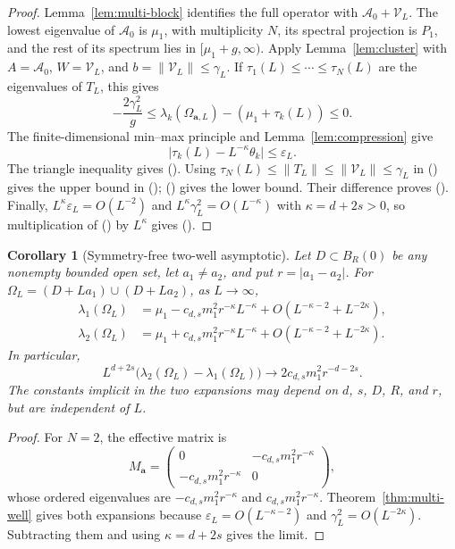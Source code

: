 \documentclass[twoside,10pt]{article}
\numberwithin{equation}{section}
\theoremstyle{slbody}
\newtheorem{corollary}[theorem]{Corollary}
\theoremstyle{definition}
\newcommand{\norm}[1]{\lVert #1\rVert}
\newcommand{\abs}[1]{\lvert #1\rvert}
\renewcommand{\eqref}[1]{%
  \textup{{\normalfont(\oldstylenums{\ref{#1}}}\normalfont)}}
\begin{document}
\begin{proof}
Lemma~\ref{lem:multi-block} identifies the full operator with
$\mathcal A_0+\mathcal V_L$.  The lowest eigenvalue of $\mathcal A_0$ is
$\mu_1$, with multiplicity $N$, its spectral projection is $P_1$, and the
rest of its spectrum lies in $[\mu_1+g,\infty)$.  Apply
Lemma~\ref{lem:cluster} with $A=\mathcal A_0$, $W=\mathcal V_L$, and
$b=\norm{\mathcal V_L}\leq\gamma_L$.  If
$\tau_1(L)\leq\cdots\leq\tau_N(L)$ are the eigenvalues of $T_L$, this gives
\begin{equation}\label{eq:exact-cluster-comparison}
 -\frac{2\gamma_L^2}{g}
 \leq\lambda_k(\Omega_{\mathbf a,L})-(\mu_1+\tau_k(L))\leq0.
\end{equation}
The finite-dimensional min--max principle and
Lemma~\ref{lem:compression} give
\[
 \abs{\tau_k(L)-L^{-\kappa}\theta_k}\leq\varepsilon_L.
\]
The triangle inequality gives \eqref{eq:multi-eigenvalue-bound}.  Using
$\tau_N(L)\leq\norm{T_L}\leq\norm{\mathcal V_L}\leq\gamma_L$ in
\eqref{eq:exact-cluster-comparison} gives the upper bound in
\eqref{eq:multi-cluster-edges}; \eqref{eq:cluster-separation} gives the lower
bound.  Their difference proves \eqref{eq:multi-cluster-gap}.
Finally, $L^\kappa\varepsilon_L=O(L^{-2})$ and
$L^\kappa\gamma_L^2=O(L^{-\kappa})$ with $\kappa=d+2s>0$, so multiplication
of \eqref{eq:multi-eigenvalue-bound} by $L^\kappa$ gives
\eqref{eq:multi-limit}.
\end{proof}

\begin{corollary}[Symmetry-free two-well asymptotic]
\label{cor:symmetry-free-two}
Let $D\subset B_R(0)$ be any nonempty bounded open set, let $a_1\ne a_2$, and
put $r=\abs{a_1-a_2}$.  For
$\Omega_L=(D+La_1)\cup(D+La_2)$, as $L\to\infty$,
\begin{align*}
 \lambda_1(\Omega_L)
 &=\mu_1-c_{d,s}m_1^2r^{-\kappa}L^{-\kappa}
   +O\!\left(L^{-\kappa-2}+L^{-2\kappa}\right),\\
 \lambda_2(\Omega_L)
 &=\mu_1+c_{d,s}m_1^2r^{-\kappa}L^{-\kappa}
   +O\!\left(L^{-\kappa-2}+L^{-2\kappa}\right).
\end{align*}
In particular,
\[
 L^{d+2s}\bigl(\lambda_2(\Omega_L)-\lambda_1(\Omega_L)\bigr)
 \longrightarrow 2c_{d,s}m_1^2r^{-d-2s}.
\]
The constants implicit in the two expansions may depend on $d$, $s$, $D$,
$R$, and $r$, but are independent of $L$.
\end{corollary}

\begin{proof}
For $N=2$, the effective matrix is
\[
 M_{\mathbf a}
 =\begin{pmatrix}
 0&-c_{d,s}m_1^2r^{-\kappa}\\
 -c_{d,s}m_1^2r^{-\kappa}&0
 \end{pmatrix},
\]
whose ordered eigenvalues are
$-c_{d,s}m_1^2r^{-\kappa}$ and $c_{d,s}m_1^2r^{-\kappa}$.
Theorem~\ref{thm:multi-well} gives both expansions because
$\varepsilon_L=O(L^{-\kappa-2})$ and
$\gamma_L^2=O(L^{-2\kappa})$.  Subtracting them and using $\kappa=d+2s$
gives the limit.
\end{proof}
\end{document}
